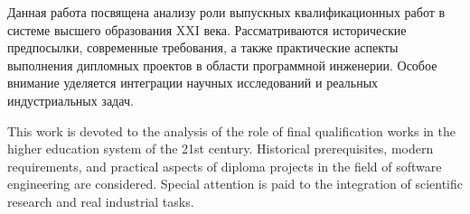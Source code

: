\documentclass{HSEDiploma}
\begin{document}
	
	\titlepage
	
	\begin{abstractpagerus}
		Данная работа посвящена анализу роли выпускных квалификационных работ в системе высшего образования XXI века. Рассматриваются исторические предпосылки, современные требования, а также практические аспекты выполнения дипломных проектов в области программной инженерии. Особое внимание уделяется интеграции научных исследований и реальных индустриальных задач.
	\end{abstractpagerus}
	
	\begin{abstractpageeng}
		This work is devoted to the analysis of the role of final qualification works in the higher education system of the 21st century. Historical prerequisites, modern requirements, and practical aspects of diploma projects in the field of software engineering are considered. Special attention is paid to the integration of scientific research and real industrial tasks.
	\end{abstractpageeng}
	
	\tableofcontents
	
	
	
	
	
\end{document}
